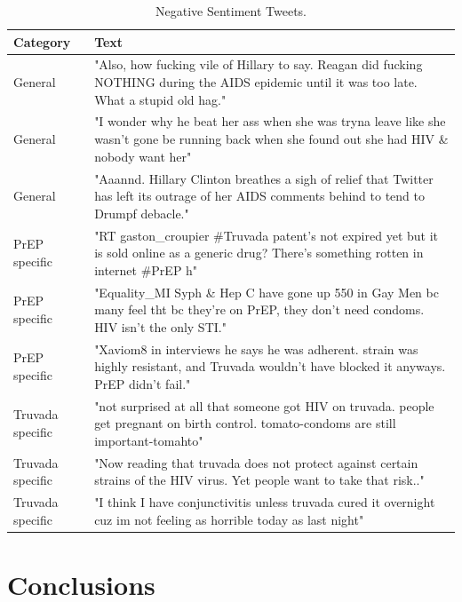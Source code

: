 \documentclass{sig-alternate-05-2015}
\begin{document}
\begin{table}
\centering
\caption{Negative Sentiment Tweets.}
\begin{tabular}{|p{2cm}|p{12cm}|} \hline
Category & Text\\ \hline
General & "Also, how fucking vile of Hillary to say. Reagan did fucking NOTHING during the AIDS epidemic until it was too late. What a stupid old hag."\\ \hline
General & "I wonder why he beat her ass when she was tryna leave like she wasn't gone be running back when she found out she had HIV \& nobody want her"\\ \hline
General & "Aaannd. Hillary Clinton breathes a sigh of relief that Twitter has left its outrage of her AIDS comments behind to tend to Drumpf debacle."\\ \hline

PrEP specific & "RT gaston\_croupier \#Truvada patent's not expired yet but it is sold online as a generic drug? There's something rotten in internet \#PrEP h"\\ \hline
PrEP specific & "Equality\_MI Syph \& Hep C have gone up 550 in Gay Men bc many feel tht bc they're on PrEP, they don't need condoms. HIV isn't the only STI."\\ \hline
PrEP specific & "Xaviom8 in interviews he says he was adherent. strain was highly resistant, and Truvada wouldn't have blocked it anyways. PrEP didn't fail."\\ \hline

Truvada specific & "not surprised at all that someone got HIV on truvada. people get pregnant on birth control. tomato-condoms are still important-tomahto"\\ \hline
Truvada specific & "Now reading that truvada does not protect against certain strains of the HIV virus. Yet people want to take that risk.."\\ \hline
Truvada specific & "I think I have conjunctivitis unless truvada cured it overnight cuz im not feeling as horrible today as last night"\\ \hline

\hline\end{tabular}
\end{table}


\section{Conclusions}
\end{document}
